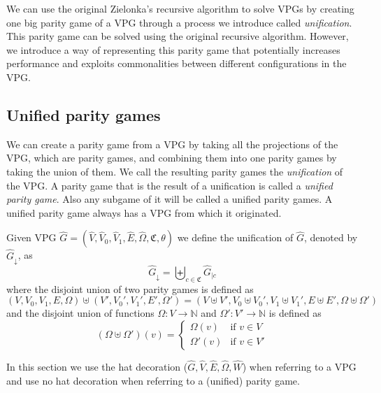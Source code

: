 We can use the original Zielonka's recursive algorithm to solve VPGs by creating one big parity game of a VPG through a process we introduce called \textit{unification}. This parity game can be solved using the original recursive algorithm. However, we introduce a way of representing this parity game that potentially increases performance and exploits commonalities between different configurations in the VPG.

\subsection{Unified parity games}
We can create a parity game from a VPG by taking all the projections of the VPG, which are parity games, and combining them into one parity games by taking the union of them. We call the resulting parity games the \textit{unification} of the VPG. A parity game that is the result of a unification is called a \textit{unified parity game}. Also any subgame of it will be called a unified parity games. A unified parity game always has a VPG from which it originated.
\begin{definition}
	Given VPG $\hat{G} = (\hat{V},\hat{V}_0,\hat{V}_1, \hat{E},\hat{\Omega}, \mathfrak{C},\theta)$ we define the unification of $\hat{G}$, denoted by $\hat{G}_{\downarrow}$, as
	\[  \hat{G}_{\downarrow} = \biguplus_{c\in \mathfrak{C}}\hat{G}_{|c} \]
	where the disjoint union of two parity games is defined as
	\[ (V,V_0,V_1,E,\Omega) \uplus (V',V_0',V_1',E',\Omega') = (V \uplus V', V_0 \uplus V_0', V_1 \uplus V_1', E \uplus E', \Omega \uplus \Omega') \]
	and the disjoint union of functions $\Omega : V \rightarrow \mathbb{N}$ and $\Omega' : V' \rightarrow \mathbb{N}$ is defined as
	\[ (\Omega \uplus \Omega')(v) = \begin{cases}
	\Omega(v) & \text{if }v \in V \\
	\Omega'(v) & \text{if }v \in V'
	\end{cases}\]
\end{definition}
In this section we use the hat decoration ($\hat{G},\hat{V},\hat{E},\hat{\Omega},\hat{W}$) when referring to a VPG and use no hat decoration when referring to a (unified) parity game.

